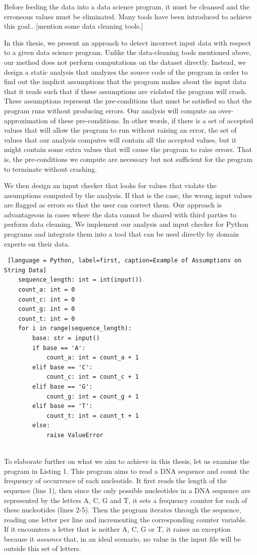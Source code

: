 \documentclass[10pt]{report}
\begin{document}
Before feeding the data into a data science program, it must be cleansed and the erroneous values must be eliminated. Many tools have been introduced to achieve this goal.. [mention some data cleaning tools.] 

In this thesis, we present an approach to detect incorrect input data with respect to a given data science program. Unlike the data-cleaning tools mentioned above, our method does not perform computations on the dataset directly. Instead, we design a static analysis that analyzes the source code of the program in order to find out the implicit assumptions that the program makes about the input data that it reads such that if these assumptions are violated the program will crash. These assumptions represent the pre-conditions that must be satisfied so that the program runs without producing errors. Our analysis will compute an over-approximation of these pre-conditions. In other words, if there is a set of accepted values that will allow the program to run without raising an error, the set of values that our analysis computes will contain all the accepted values, but it might contain some extra values that will cause the program to raise errors. That is, the pre-conditions we compute are necessary but not sufficient for the program to terminate without crashing. 

We then design an input checker that looks for values that violate the assumptions computed by the analysis. If that is the case, the wrong input values are flagged as errors so that the user can correct them. Our approach is advantageous in cases where the data cannot be shared with third parties to perform data cleaning. We implement our analysis and input checker for Python programs and integrate them into a tool that can be used directly by domain experts on their data. 
\begin{lstlisting} [language = Python, label=first, caption=Example of Assumptions on String Data] 
	sequence_length: int = int(input())
	count_a: int = 0
	count_c: int = 0
	count_g: int = 0
	count_t: int = 0
	for i in range(sequence_length):
		base: str = input()
		if base == 'A':
			count_a: int = count_a + 1
		elif base == 'C':
			count_c: int = count_c + 1
		elif base == 'G':
			count_g: int = count_g + 1
		elif base == 'T':
			count_t: int = count_t + 1
		else:
			raise ValueError
			
\end{lstlisting} 

To elaborate further on what we aim to achieve in this thesis, let us examine the program in Listing 1. This program aims to read a DNA sequence and count the frequency of occurrence of each nucleotide. It first reads the length of the sequence (line 1), then since the only possible nucleotides in a DNA sequence are represented by the letters A, C, G and T, it sets a frequency counter for each of these nucleotides (lines 2-5). Then the program iterates through the sequence, reading one letter per line and incrementing the corresponding counter variable. If it encounters a letter that is neither A, C, G or T, it raises an exception because it \textit{assumes} that, in an ideal scenario, no value in the input file will be outside this set of letters.  
\end{document}
